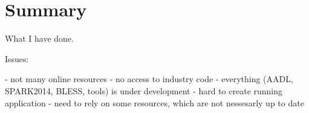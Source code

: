 
\cleardoublepage


\chapter{Summary}
\label{summary}

What I have done.

Issues:

- not many online resources
- no access to industry code
- everything (AADL, SPARK2014, BLESS, tools) is under development
- hard to create running application
- need to rely on some resources, which are not nessesarly up to date
